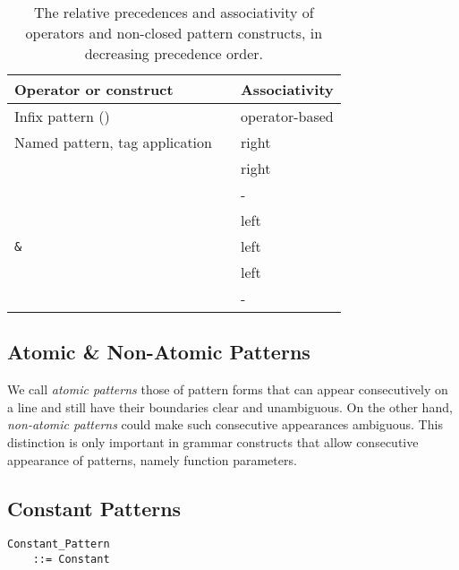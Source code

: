 \begin{table}[h!]
  \caption{The relative precedences and associativity of operators and non-closed pattern constructs, in decreasing precedence order.}
\begin{center}
\begin{tabular}{l l}
  Operator or construct & Associativity \\ \hline \hline
  Infix pattern () & operator-based \\ \hline
  Named pattern, tag application\ \  & right \\ \hline
  \code{::} & right \\ \hline
  \code{=>} & - \\ \hline
  \code{,} & left \\ \hline
  \lstinline!&! & left \\ \hline
  \code{|} & left \\ \hline
   & - \\ \hline
\end{tabular}
\end{center}
\label{table:pattern-matching-op-precedences}
\end{table}%





\subsection[Atomic \& Non-Atomic Patterns]{Atomic \& Non-Atomic Patterns}
\label{sec:atomic-patterns}
\label{sec:non-atomic-patterns}

We call {\em atomic patterns} those of pattern forms that can appear consecutively on a line and still have their boundaries clear and unambiguous. On the other hand, {\em non-atomic patterns} could make such consecutive appearances ambiguous. This distinction is only important in grammar constructs that allow consecutive appearance of patterns, namely function parameters. 





\subsection{Constant Patterns}
\label{sec:constant-patterns}

\grammar\begin{lstlisting}
Constant_Pattern 
    ::= Constant
\end{lstlisting}

